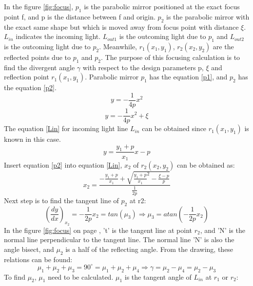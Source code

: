 In the figure \ref{fig:focus}, $p_{1}$ is the parabolic mirror positioned at the exact focus point f, and p is the distance between f and origin. $p_{2}$ is the parabolic mirror with the exact same shape but which is moved away from focus point with distance $\xi$. $L_{in}$ indicates the incoming light. $L_{out1}$ is the outcoming light due to $p_{1}$ and $L_{out2}$ is the outcoming light due to $p_{2}$. Meanwhile, $r_{1}(x_{1}, y_{1})$, $r_{2}(x_{2}, y_{2})$ are the reflected points due to $p_{1}$ and $p_{2}$. The purpose of this focusing calculation is to find the divergent angle $\gamma$ with respect to the design parameters p, $\xi$ and reflection point $r_{1}(x_{1}, y_{1}) $\cite{parabolic_wiki}. Parabolic mirror $p_{1}$ has the equation \ref{p1}, and $p_{2}$ has the equation \ref{p2}. 
\begin{equation}
\label{p1}
y = -\frac{1}{4p}x^{2}
\end {equation}
\begin{equation}
\label{p2}
y = -\frac{1}{4p}x^{2}+\xi
\end {equation}
The equation \ref{Lin} for incoming light line $L_{in}$ can be obtained since $r_{1}(x_{1}, y_{1})$ is known in this case. 
\begin{equation}
\label{Lin}
y = \frac{y_{1}+p}{x_{1}}x-p
\end {equation}
Insert equation \ref{p2} into equation \ref{Lin}, $x_{2}$ of $r_{2}(x_{2}, y_{2})$ can be obtained as:
\begin{equation}
\label{x2}
x_{2} = \frac{-\frac{y_{1}+p}{x_{1}}+\sqrt{{\frac{y_{1}+p}{x_{1}}}^2-\frac{\xi-p}{p}}}{\frac{1}{2p}}
\end {equation}
Next step is to find the tangent line of $p_{2}$ at r2:
\begin{equation}
\label{miu3}
(\frac{dy}{dx})_{x_{2}} = -\frac{1}{2p}x_{2} = tan(\mu_{3}) \Rightarrow \mu_{3} = atan(-\frac{1}{2p}x_{2})
\end {equation}
In the figure \ref{fig:focus} on page \pageref{fig:focus}, 't' is the tangent line at point $r_{2}$, and 'N' is the normal line perpendicular to the tangent line. The normal line 'N' is also the angle bisect, and $\mu_{2}$ is a half of the reflecting angle. From the drawing, these relations can be found:
\begin{equation}
\label{gamma}
\mu_{1}+\mu_{2}+\mu_{3} = 90^{\circ} = \mu_{1}+\mu_{2}+\mu_{4}
\Longrightarrow \gamma = \mu_{2} - \mu_{4} = \mu_{2} - \mu_{3} 
\end {equation}
To find $\mu_{2}$, $\mu_{1}$ need to be calculated. $\mu_{1}$ is the tangent angle of $L_{in}$ at $r_{1}$ or $r_{2}$:
